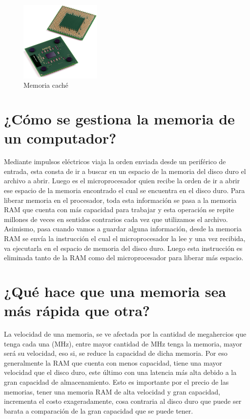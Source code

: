 \documentclass{article}
\begin{document}
\begin{figure}[h]
\includegraphics[width=4cm]{cache.PNG}
\centering
\caption{Memoria caché}
\end{figure}

\section{¿Cómo se gestiona la memoria de un computador?}
\noindent Mediante impulsos eléctricos viaja la orden enviada desde un periférico de entrada, esta consta de ir a buscar en un espacio de la memoria del disco duro el archivo a abrir. Luego es el microprocesador quien recibe la orden de ir a abrir ese espacio de la memoria encontrado el cual se encuentra en el disco duro. Para liberar memoria en el procesador, toda esta información se pasa a la memoria RAM que cuenta con más capacidad para trabajar y esta operación se repite millones de veces en sentidos contrarios cada vez que utilizamos el archivo. Asimismo, pasa cuando vamos a guardar alguna información, desde la memoria RAM se envía la instrucción el cual el microprocesador la lee y una vez recibida, va ejecutarla en el espacio de memoria del disco duro. Luego esta instrucción es eliminada tanto de la RAM como del microprocesador para liberar más espacio. \cite{gestion}

\vspace{5mm}

\section{¿Qué hace que una memoria sea más rápida que otra?}
\noindent La velocidad de una memoria, se ve afectada por la cantidad de megahercios que tenga cada una (MHz), entre mayor cantidad de MHz tenga la memoria, mayor será su velocidad, eso si, se reduce la capacidad de dicha memoria. Por eso generalmente la RAM que cuenta con menos capacidad, tiene una mayor velocidad que el disco duro, este último con una latencia más alta debido a la gran capacidad de almacenamiento. Esto es importante por el precio de las memorias, tener una memoria RAM de alta velocidad y gran capacidad, incrementa el costo exageradamente, cosa contraria al disco duro que puede ser barata a comparación de la gran capacidad que se puede tener. \cite{velocidad} \break
\vspace{1mm}
\end{document}
